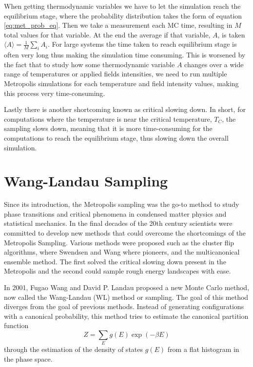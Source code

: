 When getting thermodynamic variables we have to let the simulation reach the equilibrium stage, where the probability distribution takes the form of equation \ref{eq:met_prob_eq}. Then we take a measurement each MC time, resulting in $M$ total values for that variable. At the end the average if that variable, $A$, is taken $\langle A \rangle = \frac{1}{M} \sum_i A_i$. 
For large systems the time taken to reach equilibrium stage is often very long thus making the simulation time consuming. 
This is worsened by the fact that to study how some thermodynamic variable $A$ changes over a wide range of temperatures or applied fields intensities, we need to run multiple Metropolis simulations for each temperature and field intensity values, making this process very time-consuming.

Lastly there is another shortcoming known as critical slowing down. In short, for computations where the temperature is near the critical temperature, $T_C$, the sampling slows down, meaning that it is more time-consuming for the computations to reach the equilibrium stage, thus slowing down the overall simulation.

\section{Wang-Landau Sampling}

Since its introduction, the Metropolis sampling was the go-to method to study phase transitions and critical phenomena in condensed matter physics and statistical mechanics. In the final decades of the 20th century scientists were committed to develop new methods that could overcome the shortcomings of the Metropolis Sampling. Various methods were proposed such as the cluster flip algorithms, where Swendsen and Wang where pioneers, and the multicanonical ensemble method. The first solved the critical slowing down present in the Metropolis and the second could sample rough energy landscapes with ease. 

In 2001, Fugao Wang and David P. Landau proposed a new Monte Carlo method, now called the Wang-Landau (WL) method or sampling. The goal of this method diverges from the goal of previous methods. Instead of generating configurations with a canonical probability, this method tries to estimate the canonical partition function
\begin{equation}
	Z = \sum_E g(E) \exp(-\beta E)
\end{equation}
through the estimation of the density of states $g(E)$ from a flat histogram in the phase space.

